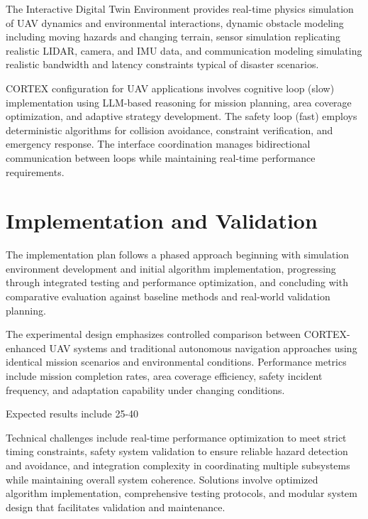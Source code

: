 The Interactive Digital Twin Environment provides real-time physics simulation of UAV dynamics and environmental interactions, dynamic obstacle modeling including moving hazards and changing terrain, sensor simulation replicating realistic LIDAR, camera, and IMU data, and communication modeling simulating realistic bandwidth and latency constraints typical of disaster scenarios.

CORTEX configuration for UAV applications involves cognitive loop (slow) implementation using LLM-based reasoning for mission planning, area coverage optimization, and adaptive strategy development. The safety loop (fast) employs deterministic algorithms for collision avoidance, constraint verification, and emergency response. The interface coordination manages bidirectional communication between loops while maintaining real-time performance requirements.

\section{Implementation and Validation}

The implementation plan follows a phased approach beginning with simulation environment development and initial algorithm implementation, progressing through integrated testing and performance optimization, and concluding with comparative evaluation against baseline methods and real-world validation planning.

The experimental design emphasizes controlled comparison between CORTEX-enhanced UAV systems and traditional autonomous navigation approaches using identical mission scenarios and environmental conditions. Performance metrics include mission completion rates, area coverage efficiency, safety incident frequency, and adaptation capability under changing conditions.

Expected results include 25-40%

Technical challenges include real-time performance optimization to meet strict timing constraints, safety system validation to ensure reliable hazard detection and avoidance, and integration complexity in coordinating multiple subsystems while maintaining overall system coherence. Solutions involve optimized algorithm implementation, comprehensive testing protocols, and modular system design that facilitates validation and maintenance.

